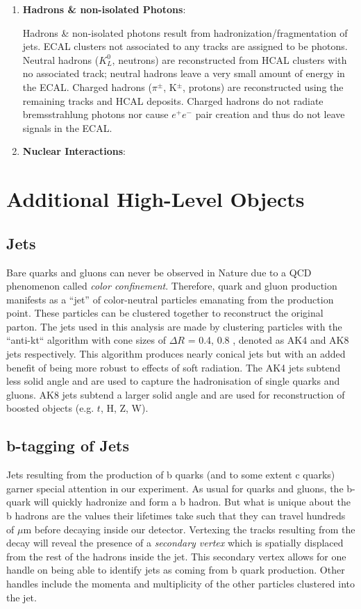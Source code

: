\begin{enumerate}
\item \textbf{Hadrons \& non-isolated Photons}:

Hadrons \& non-isolated photons result from hadronization/fragmentation of jets. ECAL clusters not associated to any tracks are assigned to be photons. Neutral hadrons ($K^{0}_{L}$, neutrons) are reconstructed from HCAL clusters with no associated track; neutral hadrons leave a very small amount of energy in the ECAL. Charged hadrons ($\pi^{\pm}$, K$^{\pm}$, protons) are reconstructed using the remaining tracks and HCAL deposits. Charged hadrons do not radiate bremsstrahlung photons nor cause $e^{+}e^{-}$ pair creation and thus do not leave signals in the ECAL.

\item \textbf{Nuclear Interactions}:
\end{enumerate}

\section{Additional High-Level Objects}

\subsection{Jets}

Bare quarks and gluons can never be observed in Nature due to a QCD phenomenon called \textit{color confinement}. Therefore, quark and gluon production manifests as a ``jet'' of color-neutral particles emanating from the production point. These particles can be clustered together to reconstruct the original parton. The jets used in this analysis are made by clustering particles with the ``anti-kt`` algorithm with cone sizes of $\Delta R$ = 0.4, 0.8 \cite{1126-6708-2008-04-063}, denoted as AK4 and AK8 jets respectively. This algorithm produces nearly conical jets but with an added benefit of being more robust to effects of soft radiation. The AK4 jets subtend less solid angle and are used to capture the hadronisation of single quarks and gluons. AK8 jets subtend a larger solid angle and are used for reconstruction of boosted objects (e.g. $t$, H, Z, W).

\subsection{b-tagging of Jets}

Jets resulting from the production of b quarks (and to some extent c quarks) garner special attention in our experiment. As usual for quarks and gluons, the b-quark will quickly hadronize and form a b hadron. But what is unique about the b hadrons are the values their lifetimes take such that they can travel hundreds of $\mu$m before decaying inside our detector. Vertexing the tracks resulting from the decay will reveal the presence of a \textit{secondary vertex} which is spatially displaced from the rest of the hadrons inside the jet. This secondary vertex allows for one handle on being able to identify jets as coming from b quark production. Other handles include the momenta and multiplicity of the other particles clustered into the jet.


